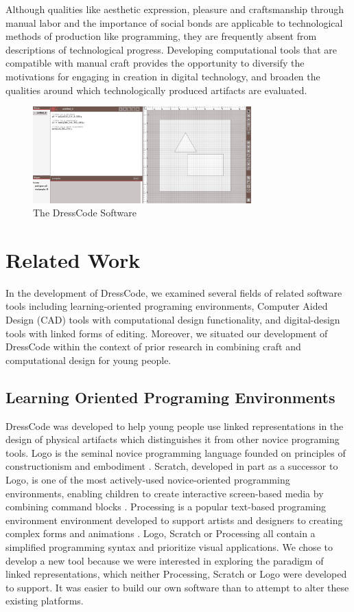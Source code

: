 \documentclass{sigchi}
\begin{document}
Although qualities like aesthetic expression, pleasure and craftsmanship through manual labor and the importance of social bonds are applicable to technological methods of production like programming, they are frequently absent from descriptions of technological progress. Developing computational tools that are compatible with manual craft provides the opportunity to diversify the motivations for engaging in creation in digital technology, and broaden the qualities around which technologically produced artifacts are evaluated.

\begin{figure}
\begin{center}
\includegraphics[width=0.75\textwidth]{images/application_image_sm_content.jpg}
\caption{The DressCode Software}
\label{fig:application_image}
\end{center}
\end{figure}

\section{Related Work}
In the development of DressCode, we examined several fields of related software tools including learning-oriented programing environments, Computer Aided Design (CAD) tools with computational design functionality, and digital-design tools with linked forms of editing. Moreover, we situated our development of DressCode within the context of prior research in combining craft and computational design for young people.

\subsection{Learning Oriented Programing Environments}
 DressCode was developed to help young people use linked representations in the design of physical artifacts which distinguishes it from other novice programing tools. Logo is the seminal novice programming language founded on principles of constructionism and embodiment \cite{papert}. Scratch, developed in part as a successor to Logo, is one of the most actively-used novice-oriented programming environments, enabling children to create interactive screen-based media by combining command blocks \cite{resnick2}. Processing is a popular text-based programing environment environment developed to support artists and designers to creating complex forms and animations \cite{processing}. Logo, Scratch or Processing all contain a simplified programming syntax and prioritize visual applications. We chose to develop a new tool because we were interested in exploring the paradigm of linked representations, which neither Processing, Scratch or Logo were developed to support. It was easier to build our own software than to attempt to alter these existing platforms.
\end{document}
